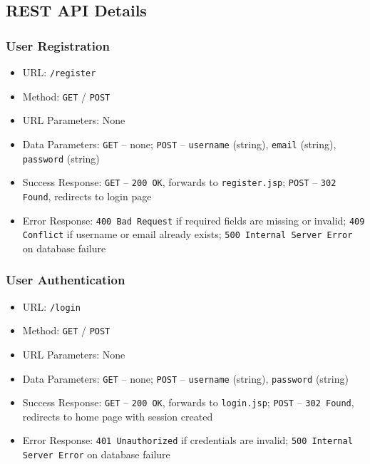\subsection{REST API Details}

\subsubsection*{User Registration}

\begin{itemize}
    \item URL: \texttt{/register}
    \item Method: \texttt{GET} / \texttt{POST}
    \item URL Parameters: None
    \item Data Parameters: \texttt{GET} -- none; \texttt{POST} -- \texttt{username} (string), \texttt{email} (string), \texttt{password} (string)
    \item Success Response: \texttt{GET} -- \texttt{200 OK}, forwards to \texttt{register.jsp}; \texttt{POST} -- \texttt{302 Found}, redirects to login page
    \item Error Response: \texttt{400 Bad Request} if required fields are missing or invalid; \texttt{409 Conflict} if username or email already exists; \texttt{500 Internal Server Error} on database failure
\end{itemize}

\subsubsection*{User Authentication}

\begin{itemize}
    \item URL: \texttt{/login}
    \item Method: \texttt{GET} / \texttt{POST}
    \item URL Parameters: None
    \item Data Parameters: \texttt{GET} -- none; \texttt{POST} -- \texttt{username} (string), \texttt{password} (string)
    \item Success Response: \texttt{GET} -- \texttt{200 OK}, forwards to \texttt{login.jsp}; \texttt{POST} -- \texttt{302 Found}, redirects to home page with session created
    \item Error Response: \texttt{401 Unauthorized} if credentials are invalid; \texttt{500 Internal Server Error} on database failure
\end{itemize}


